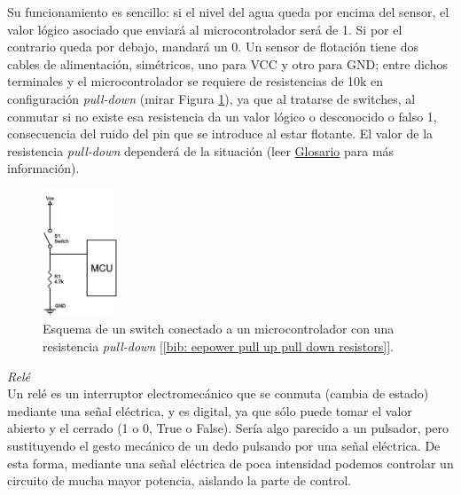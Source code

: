 \documentclass[12pt]{article}
\begin{document}
	
	\noindent Su funcionamiento es sencillo: si el nivel del agua queda por encima del sensor, el valor lógico asociado que enviará al microcontrolador será de 1. Si por el contrario queda por debajo, mandará un 0. Un sensor de flotación tiene dos cables de alimentación, simétricos, uno para VCC y otro para GND; entre dichos terminales y el microcontrolador se requiere de resistencias de 10k en configuración \textit{pull-down} (mirar Figura \ref{Esquema resistencia pull-down}), ya que al tratarse de switches, al conmutar si no existe esa resistencia da un valor lógico o desconocido o falso 1, consecuencia del ruido del pin que se introduce al estar flotante. El valor de la resistencia \textit{pull-down} dependerá de la situación (leer \hyperref[glosario]{Glosario} para más información).\\
	
	\pagebreak
	
	\begin{figure}[h]
		\begin{center}
			\includegraphics[width=0.2\textwidth]{img/pull-down-resistor.png}
			\caption{Esquema de un switch conectado a un microcontrolador con una resistencia \textit{pull-down} [\ref{bib: eepower pull up pull down resistors}].}
			\label{Esquema resistencia pull-down}
		\end{center}
	\end{figure}

	\noindent \textit{Relé} \\
	
	\noindent Un relé es un interruptor electromecánico que se conmuta (cambia de estado) mediante una señal eléctrica, y es digital, ya que sólo puede tomar el valor abierto y el cerrado (1 o 0, True o False). Sería algo parecido a un pulsador, pero sustituyendo el gesto mecánico de un dedo pulsando por una señal eléctrica. De esta forma, mediante una señal eléctrica de poca intensidad podemos controlar un circuito de mucha mayor potencia, aislando la parte de control. 
	
\end{document}
